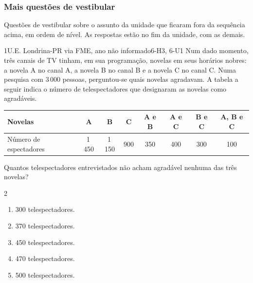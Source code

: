 \subsubsection*{Mais questões de vestibular}
Questões de vestibular sobre o assunto da unidade que ficaram fora da sequência acima, em ordem de nível. As respostas estão no fim da unidade, com as demais.

\begin{questao}{1}{U.E. Londrina-PR via FME, ano não informado}{6-H3, 6-U1}\label{u6:uel25}
Num dado momento, três canais de TV tinham, em sua programação, novelas em seus horários nobres: a novela A no canal A, a novela B no canal B e a novela C no canal C. Numa pesquisa com 3\,000 pessoas, perguntou-se quais novelas agradavam. A tabela a seguir indica o número de telespectadores que designaram as novelas como agradáveis.
\begin{center}
\small
\begin{tabular}{l|ccccccc}
Novelas & A & B & C & A e B & A e C & B e C & A, B e C\\\hline
Número de espectadores & 1\,450 & 1\,150 & 900 & 350 & 400 & 300 & 100
\end{tabular}
\end{center}
Quantos telespectadores entrevistados não acham agradável nenhuma das três novelas?
\begin{multicols}{2}
\begin{enumerate}[label=\alph*)]
  \item 300 telespectadores.
  \item 370 telespectadores.
  \item 450 telespectadores.
  \item 470 telespectadores.
  \item 500 telespectadores.
\end{enumerate}
\end{multicols}
\end{questao}

